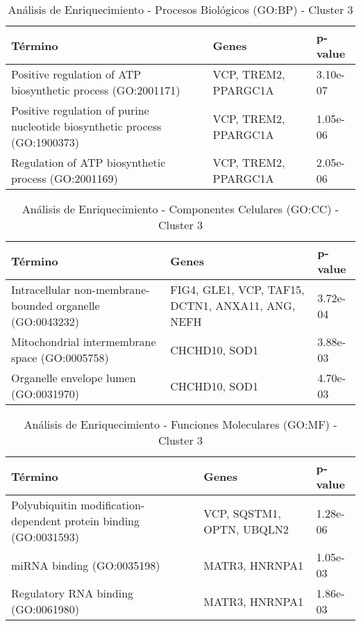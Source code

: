 \begin{table}[ht]
	\centering
	\caption{Análisis de Enriquecimiento - Procesos Biológicos (GO:BP) - Cluster 3}
	\begin{tabular}{|l|l|l|}
		\hline
		\textbf{Término} & \textbf{Genes} & \textbf{p-value} \\ \hline
		Positive regulation of ATP biosynthetic process (GO:2001171) & VCP, TREM2, PPARGC1A & 3.10e-07 \\ \hline
		Positive regulation of purine nucleotide biosynthetic process (GO:1900373) & VCP, TREM2, PPARGC1A & 1.05e-06 \\ \hline
		Regulation of ATP biosynthetic process (GO:2001169) & VCP, TREM2, PPARGC1A & 2.05e-06 \\ \hline
	\end{tabular}
\end{table}

\begin{table}[ht]
	\centering
	\caption{Análisis de Enriquecimiento - Componentes Celulares (GO:CC) - Cluster 3}
	\begin{tabularx}{\textwidth}{|l|X|l|}
		\hline
		\textbf{Término} & \textbf{Genes} & \textbf{p-value} \\ \hline
		Intracellular non-membrane-bounded organelle (GO:0043232) & FIG4, GLE1, VCP, TAF15, DCTN1, ANXA11, ANG, NEFH & 3.72e-04 \\ \hline
		Mitochondrial intermembrane space (GO:0005758) & CHCHD10, SOD1 & 3.88e-03 \\ \hline
		Organelle envelope lumen (GO:0031970) & CHCHD10, SOD1 & 4.70e-03 \\ \hline
	\end{tabularx}
\end{table}


\begin{table}[ht]
	\centering
	\caption{Análisis de Enriquecimiento - Funciones Moleculares (GO:MF) - Cluster 3}
	\begin{tabular}{|l|l|l|}
		\hline
		\textbf{Término} & \textbf{Genes} & \textbf{p-value} \\ \hline
		Polyubiquitin modification-dependent protein binding (GO:0031593) & VCP, SQSTM1, OPTN, UBQLN2 & 1.28e-06 \\ \hline
		miRNA binding (GO:0035198) & MATR3, HNRNPA1 & 1.05e-03 \\ \hline
		Regulatory RNA binding (GO:0061980) & MATR3, HNRNPA1 & 1.86e-03 \\ \hline
	\end{tabular}
\end{table}

